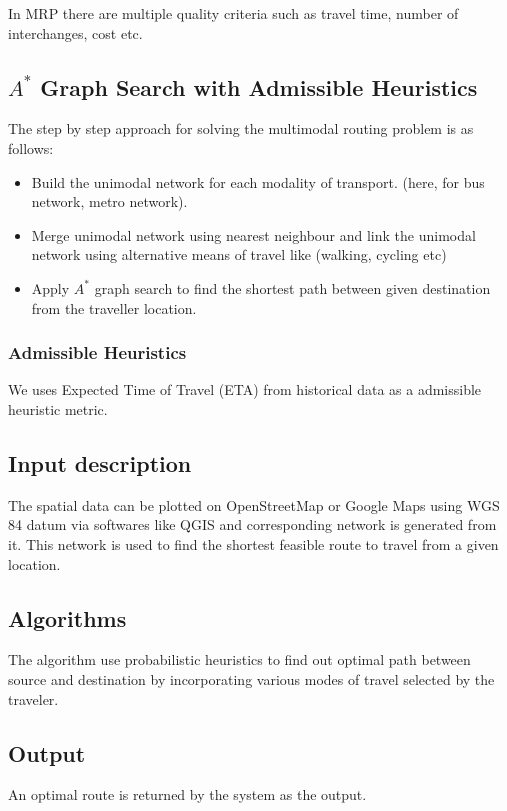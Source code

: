 \documentclass[12pt,a4paper]{article}
\begin{document}
In MRP there are multiple quality criteria such as travel time, number of interchanges, cost etc.

\subsection{$A^{*}$ Graph Search with Admissible Heuristics}

The step by step approach for solving the multimodal routing problem is as follows:

\begin{itemize}
\item Build the unimodal network for each modality of transport. (here, for bus network, metro network).
\item Merge unimodal network using nearest neighbour and link the unimodal network using alternative means of travel like (walking, cycling etc)
\item Apply $A^{*}$ graph search to find the shortest path between given destination from the traveller location.
\end{itemize}

\subsubsection{Admissible Heuristics}
We uses Expected Time of Travel (ETA) from historical data as a admissible heuristic metric.

\subsection{Input description}
The spatial data can be plotted on OpenStreetMap or Google Maps using WGS 84 datum via softwares like QGIS and corresponding network is generated from it. This network is used to find the shortest feasible route to travel from a given location.

\subsection{Algorithms}
The algorithm use probabilistic heuristics to find out optimal path between source and destination by incorporating various modes of travel selected by the traveler.

\subsection{Output}
An optimal route is returned by the system as the output.
\end{document}
